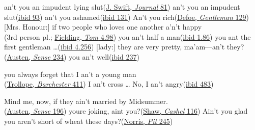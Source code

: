 \ea \label{ex:11eint}
\ea
an't you an impudent lying slut\hfill(\href{https://archive.org/details/journaltostellae00swifuoft/page/80/mode/2up?q=%22impudent+lying+slut%22&view=theater}{J. Swift, \textit{Journal} 81})
\ex an't you an impudent slut\hfill(\href{https://archive.org/details/journaltostellae00swifuoft/page/92/mode/2up?q=%22impudent+slut%2C+to+expect%22&view=theater}{ibid 93}) 
\ex an't you ashamed\hfill(\href{https://archive.org/details/journaltostellae00swifuoft/page/130/mode/2up?q=%22an%27t+you+ashamed%22&view=theater}{ibid 131}) 
\ex
An't you rich\hfill(\href{https://books.google.co.jp/books?redir_esc=y&hl=ja&id=WopaAAAAMAAJ&q=An%27t%20you%20rich&f=false#v=onepage&q=%22you%20rich%22&f=false}{Defoe, \textit{Gentleman} 129}) 
\ex
{}[Mrs. Honour:] if two people who loves one another a'n't happy\\\hfill(3rd person pl.; \href{https://archive.org/details/bim_eighteenth-century_the-history-of-tom-jones_fielding-henry_1768_4/page/98/mode/2up?q=%22a%27n%27t%22&view=theater}{Fielding, \textit{Tom} 4.98}) %
\ex
you an't half a man\hfill(\href{https://archive.org/details/bim_eighteenth-century_the-history-of-tom-jones_fielding-henry_1750_1_0/page/76/mode/2up?q=%22you+an%27t%22&view=theater}{ibid 1.86}) %
\ex
you ant the first gentleman {\dots}\hfill(\href{https://archive.org/details/bim_eighteenth-century_the-history-of-tom-jones_fielding-henry_1768_4/page/256/mode/2up?q=%22+you+ant+the+fir%C5%BFt%22&view=theater}{ibid 4.256}) %
\ex
{[lady:]} they are very pretty, ma'am---an't they?\hfill(\href{https://archive.org/details/sensesensibility00austrich/page/206/mode/2up?q=%22they+are+very+pretty%22&view=theater}{Austen, \textit{Sense} 234}) %
\ex
you an't well\hfill(\href{https://archive.org/details/sensesensibility00austrich/page/210/mode/2up?q=%22you+an%27t+well%22&view=theater}{ibid 237})

\ex\label{ex:11An't}
\ea
you always forget that I an’t a young man\\\hfill(\href{https://archive.org/details/barchestertowers0000anth_w2h4/page/344/mode/2up?q=%22an%27t%22&view=theater}{Trollope, \textit{Barchester} 411}) 
\ex
I an’t cross {\dots} No, I an’t angry\hfill(\href{https://archive.org/details/barchestertowers0000anth_w2h4/page/438/mode/2up?q=%22an%27t%22&view=theater}{ibid 483})
\z
\z
\z

\ea \label{ex:11einta}
 Mind me, now, if they ain't married by Midsummer.\\\hfill(\href{https://archive.org/details/sensesensibility00austrich/page/168/mode/2up?q=%22married+by+Midsummer%22&view=theater}{Austen, \textit{Sense} 196})
\ex youre joking, aint you?\hfill(\href{https://archive.org/details/cashelbyronsprof00shawuoft/page/n143/mode/2up?q=%22youre+joking%22&view=theater}{Shaw, \textit{Cashel} 116})
\ex Ain't you glad you aren't short of wheat these days?\hfill(\href{https://archive.org/details/pitepicofwheatde00norruoft/page/194/mode/2up?view=theater&q=%22Ain%27t+you+glad%22}{Norris, \textit{Pit} 245}) %
\z
\z

